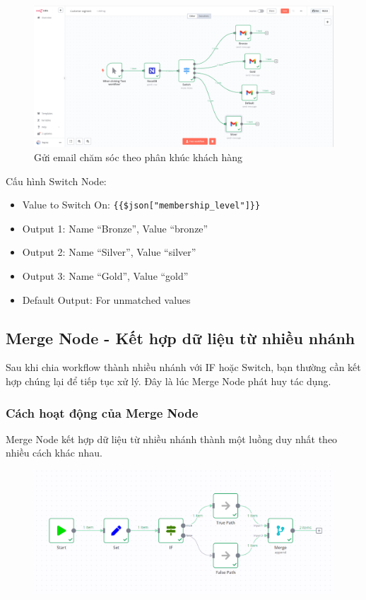 \begin{figure}[htbp]
    \centering
    \includegraphics[width=1\linewidth]{Chap1-7/segment.pdf}
    \caption{Gửi email chăm sóc theo phân khúc khách hàng}
\end{figure}

Cấu hình Switch Node:
\begin{itemize}
  \item Value to Switch On: \texttt{\{\{\$json["membership\_level"]\}\}}
  \item Output 1: Name ``Bronze'', Value ``bronze''
  \item Output 2: Name ``Silver'', Value ``silver''
  \item Output 3: Name ``Gold'', Value ``gold''
  \item Default Output: For unmatched values
\end{itemize}

\subsection{Merge Node - Kết hợp dữ liệu từ nhiều nhánh}

Sau khi chia workflow thành nhiều nhánh với IF hoặc Switch, bạn thường cần kết hợp chúng lại để tiếp tục xử lý. Đây là lúc Merge Node phát huy tác dụng.

\subsubsection{Cách hoạt động của Merge Node}

Merge Node kết hợp dữ liệu từ nhiều nhánh thành một luồng duy nhất theo nhiều cách khác nhau.

\begin{figure}[htbp]
    \centering
    \includegraphics[width=1\linewidth]{Chap1-7/merge_node.pdf}
\end{figure} 

